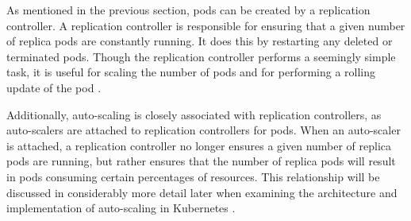 As mentioned in the previous section, pods can be created by a replication
controller. A replication controller is responsible for ensuring that a given
number of replica pods are constantly running. It does this by restarting any
deleted or terminated pods. Though the replication controller performs a
seemingly simple task, it is useful for scaling the number of pods and for
performing a rolling update of the pod \cite{k8s-replication-controllers}.

Additionally, auto-scaling is closely associated with replication controllers, as
auto-scalers are attached to replication controllers for pods. When an
auto-scaler is attached, a replication controller no longer ensures a given
number of replica pods are running, but rather ensures that the number of
replica pods will result in pods consuming certain percentages of resources.
This relationship will be discussed in considerably more detail later when
examining the architecture and implementation of auto-scaling in Kubernetes
\cite{k8s-horizontal-pod-autoscaler-proposal}.
